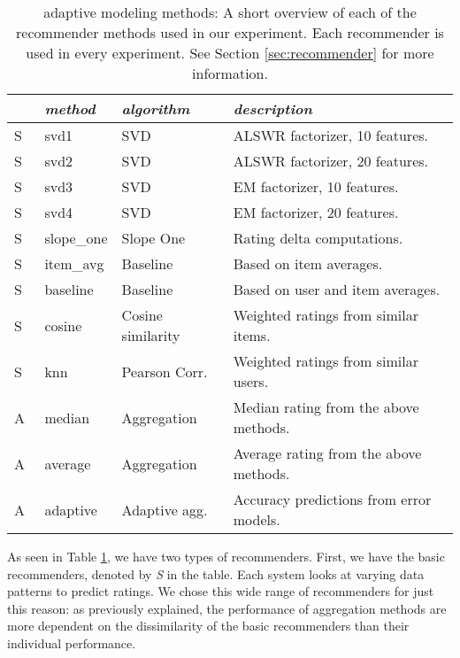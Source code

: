 \begin{table}[t]
  \begin{tabular*}{\textwidth}{ l l l l }
    \toprule
    ~ & \emph{method} &  \emph{algorithm} & \emph{description} \\
    \midrule
    S & svd1          & SVD                   & ALSWR factorizer, 10 features. \\
    S & svd2          & SVD                   & ALSWR factorizer, 20 features. \\
    S & svd3          & SVD                   & EM factorizer, 10 features. \\
    S & svd4          & SVD                   & EM factorizer, 20 features. \\
    S & slope\_one    & Slope One             & Rating delta computations. \\
    S & item\_avg     & Baseline              & Based on item averages. \\ 
    S & baseline      & Baseline              & Based on user and item averages.\\ 
    S & cosine   	    & Cosine similarity     & Weighted ratings from similar items.\\ 
    S & knn       	  & Pearson Corr.         & Weighted ratings from similar users.\\
    \midrule
    A & median    	  & Aggregation           & Median rating from the above methods. \\
    A & average    	  & Aggregation           & Average rating from the above methods. \\
    A & adaptive      & Adaptive agg.         & Accuracy predictions from error models. \\
    \bottomrule
  \end{tabular*}
  \caption[adaptive Modeling Methods]{
    adaptive modeling methods: A short overview of each of the recommender methods
    used in our experiment.
    Each recommender is used in every experiment. 
    See Section \ref{sec:recommender} for more information.
  }
  \label{table:results:methods}
\end{table}

As seen in Table \ref{table:results:methods}, we have two types of recommenders.
First, we have the basic recommenders, denoted by \emph{S} in the table.
Each system looks at varying data patterns to predict ratings.
We chose this wide range of recommenders for just this reason:
as previously explained, the performance of aggregation methods
are more dependent on the dissimilarity of the basic recommenders
than their individual performance.

